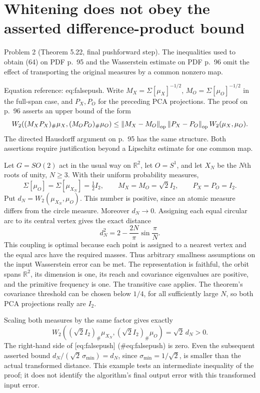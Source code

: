 \documentclass[10pt]{article}
\begin{document}
\section*{Whitening does not obey the asserted difference-product bound}
Problem 2 (Theorem 5.22, final pushforward step).  The inequalities used to obtain (64) on PDF p. 95 and the Wasserstein estimate on PDF p. 96 omit the effect of transporting the original measures by a common nonzero map.\par
Equation reference: eq:falsepush. Write \(M_X=\Sigma[\mu_X]^{-1/2}\), \(M_O=\Sigma[\mu_O]^{-1/2}\) in the full-span case, and \(P_X,P_O\) for the preceding PCA projections. The proof on p. 96 asserts an upper bound of the form \[
 W_2((M_XP_X)_\#\mu_X,(M_OP_O)_\#\mu_O)
 \le \left\lVert M_X-M_O\right\rVert_{\rm op}\left\lVert P_X-P_O\right\rVert_{\rm op}
                      W_2(\mu_X,\mu_O).\] The directed Hausdorff argument on p. 95 has the same structure. Both assertions require justification beyond a Lipschitz estimate for one common map.\par
Let \(G=SO(2)\) act in the usual way on \(\mathbb R^2\), let \(O=S^1\), and let \(X_N\) be the \(N\)th roots of unity, \(N\ge3\). With their uniform probability measures, \[\Sigma[\mu_O]=\Sigma[\mu_{X_N}]=\tfrac12I_2,\qquad
 M_X=M_O=\sqrt2 I_2,\qquad P_X=P_O=I_2.\] Put \(d_N=W_2(\mu_{X_N},\mu_O)\). This number is positive, since an atomic measure differs from the circle measure. Moreover \(d_N\to0\). Assigning each equal circular arc to its central vertex gives the exact distance \[d_N^2=2-\frac{2N}{\pi}\sin\frac{\pi}{N}.\] This coupling is optimal because each point is assigned to a nearest vertex and the equal arcs have the required masses. Thus arbitrary smallness assumptions on the input Wasserstein error can be met. The representation is faithful, the orbit spans \(\mathbb R^2\), its dimension is one, its reach and covariance eigenvalues are positive, and the primitive frequency is one. The transitive case applies. The theorem’s covariance threshold can be chosen below \(1/4\), for all sufficiently large \(N\), so both PCA projections really are \(I_2\).\par
Scaling both measures by the same factor gives exactly \[W_2((\sqrt2I_2)_\#\mu_{X_N},(\sqrt2I_2)_\#\mu_O)=\sqrt2\,d_N>0.\] The right-hand side of [eq:falsepush] (\#eq:falsepush) is zero. Even the subsequent asserted bound \(d_N/(\sqrt2\,\sigma_{\min})=d_N\), since \(\sigma_{\min}=1/\sqrt2\), is smaller than the actual transformed distance. This example tests an intermediate inequality of the proof; it does not identify the algorithm’s final output error with this transformed input error.\par
\end{document}
